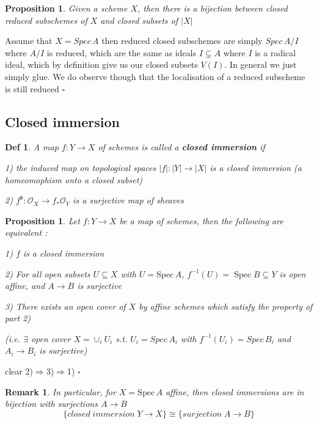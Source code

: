 \documentclass{article}
\newtheorem{definition}[theorem]{Def}
\newtheorem{proposition}[theorem]{Proposition}
\newtheorem{remark}[theorem]{Remark}
\newenvironment{Proof}{{\noindent \indent \it Proof:\quad}}{\hfill $\square$\par}
\begin{document}
\begin{proposition}
    Given a scheme $X$, then there is a bijection between closed reduced subschemes of
    $X$ and closed subsets of $|X|$
\end{proposition}
\begin{Proof}
Assume that $X = Spec\, A$ then reduced closed subschemes are simply $Spec\, A/I$ where $A/I$ is
reduced, which are the same as ideals $I \subsetneq A$ where $I$ is a radical ideal, which by definition give us our
closed subsets $V(I)$. In general we just simply glue. We do observe though that the localisation of a
reduced subscheme is still reduced
\end{Proof}


\newpage
\subsection{Closed immersion}
\begin{definition}
    A map $f:Y\to X$ of schemes is called a \textbf{closed immersion} if
    
    1) the induced map on topological spaces $|f|:|Y|\to|X|$ is a closed immersion (a homeomophism onto a closed subset) 
    
    2) $f^{\mathfrak b}:{\mathcal{O}}_{X}\to f_{\ast}{\mathcal{O}}_{Y}$ is a surjective map of sheaves
\end{definition}
\begin{proposition}
    Let $f:Y\to X$ be a map of schemes, then the following are equivalent :
    
1)   $f$ is a closed immersion
    
2) For all open subsets $U\subseteq X$ with $U={\mathrm{Spec}}\,A$,  $f^{-1}(U)=\operatorname{Spec}B\subseteq Y$ is open affine, and $A\to B$ is surjective

3) There exists an open cover of $X$ by affine schemes which satisfy the property of part 2)

(i.e. $\exists$ open cover $X=\cup_i U_i$ s.t. $U_i=Spec\,A_i$ with $f^{-1}(U_i)=Spec\,B_i$ and $A_i\to B_i$ is surjective)
\end{proposition}

\begin{Proof}
    clear 2)$\Rightarrow$3)$\Rightarrow$1)
\end{Proof}

\begin{remark}
In particular, for $X={\mathrm{Spec}}\,A$ affine, then closed immersions are in bijection with surjections $A\to B$
$$
\{closed\; immersion\;Y\rightarrow X\}
\cong
\{surjection\; A\to B\}
$$
\end{remark}
\end{document}
